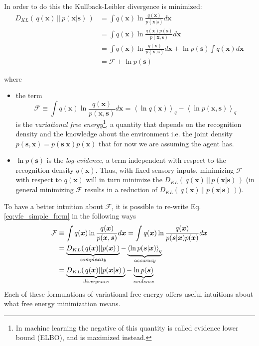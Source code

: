 \documentclass[10pt]{article}
\begin{document}
In order to do this the Kullback-Leibler  divergence is minimized:
\begin{equation}
\begin{split}
D_{KL} (\, q(\bm x)\, ||\, p(\bm x|\bm s)\, ) & = \int q(\bm x) \ln \frac{q(\bm x)}{p(\bm x|\bm s)} d\bm x \\
                                  & = \int q(\bm x) \ln \frac{q(\bm x)p(\bm s)}{p(\bm x,\bm s)} d\bm x \\
                                  & = \int q(\bm x) \ln \frac{q(\bm x)}{p(\bm x,\bm s)} d\bm x + \ln p(\bm s) \int q(\bm x) d\bm x \\
                                  & = \mathcal{F}+ \ln p(\bm s)
\end{split}
\end{equation}

where
\begin{itemize}

\item the term
\begin{equation}
\mathcal{F}\equiv \int q(\bm x) \ln \frac{q(\bm x)}{p(\bm x,\bm s)}d\bm x = \left< \ln q(\bm x) \right>_{q} - \left< \ln p(\bm x,\bm s) \right>_{q}
\label{eq:vfe_simple_form}
\end{equation} 
is the \emph{variational free energy}\footnote{In machine learning the negative of this quantity is called evidence lower bound (ELBO), and is maximized instead.}, a quantity that depends on the recognition density and the knowledge about the environment i.e. the joint density $p(\bm s, \bm x) = p(\bm s|\bm x)p(\bm x)$ that for now we are assuming the agent has. 
\item $\ln p(\bm s)$ is the \emph{log-evidence}, a term independent with respect to the recognition density $q(\bm x)$. Thus, with fixed sensory inputs, minimizing $\mathcal{F}$ with respect to $q(\bm x)$ will in turn minimize the $D_{KL} (\, q(\bm x)\, ||\, p(\bm x|\bm s)\, )$ (in general minimizing $\mathcal{F}$ results in a reduction of $D_{KL} (\, q(\bm x)\, ||\, p(\bm x|\bm s)\, )$).

\end{itemize}

To have a better intuition about $\mathcal{F}$, it is possible to re-write Eq. \ref{eq:vfe_simple_form} in the following ways
\begin{equation}
    \begin{split}
        \mathcal{F} & \equiv \int q(\bm x) \ln \frac{q(\bm x)}{p(\bm x,\bm s)}d\bm x = \int q(\bm x) \ln \frac{q(\bm x)}{p(\bm s| \bm x) p(\bm x)} d\bm x\\
        & = \underbrace{D_{KL}(\, q(\bm x) || p(\bm x) \,)}_{\text{\emph{complexity}}} - \underbrace{\left<\ln p(\bm s | \bm x) \right>_{q}}_{\text{\emph{accuracy}}} \\
        & = \underbrace{D_{KL}(\, q(\bm x) || p(\bm x | \bm s) \,)}_{\text{\emph{divergence}}} - \underbrace{\ln p(\bm s)}_{\text{\emph{evidence}}} 
    \end{split}
    \label{eq:fe_formulations}
\end{equation}
Each of these formulations of variational free energy offers useful intuitions about what free energy minimization means. 
\end{document}
